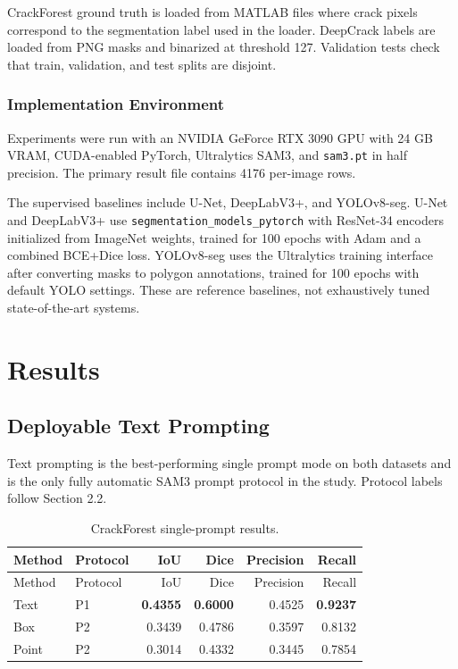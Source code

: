 \documentclass[applsci,article,submit,pdftex,moreauthors]{Definitions/mdpi}
\begin{document}
CrackForest ground truth is loaded from MATLAB files where crack pixels
correspond to the segmentation label used in the loader. DeepCrack
labels are loaded from PNG masks and binarized at threshold 127.
Validation tests check that train, validation, and test splits are
disjoint.

\subsubsection{Implementation Environment}

Experiments were run with an NVIDIA GeForce RTX 3090 GPU with 24 GB
VRAM, CUDA-enabled PyTorch, Ultralytics SAM3, and \texttt{sam3.pt} in
half precision. The primary result file contains 4176 per-image rows.

The supervised baselines include U-Net, DeepLabV3+, and YOLOv8-seg.
U-Net and DeepLabV3+ use \texttt{segmentation\_models\_pytorch} with
ResNet-34 encoders initialized from ImageNet weights, trained for 100
epochs with Adam and a combined BCE+Dice loss. YOLOv8-seg uses the
Ultralytics training interface after converting masks to polygon
annotations, trained for 100 epochs with default YOLO settings. These
are reference baselines, not exhaustively tuned state-of-the-art
systems.

\section{Results}

\subsection{Deployable Text Prompting}

Text prompting is the best-performing single prompt mode on both
datasets and is the only fully automatic SAM3 prompt protocol in the
study. Protocol labels follow Section 2.2.

\begin{longtable}[]{@{}llrrrr@{}}
\caption{CrackForest single-prompt results.}\tabularnewline
\toprule\noalign{}
Method & Protocol & IoU & Dice & Precision & Recall \\
\midrule\noalign{}
\endfirsthead
\toprule\noalign{}
Method & Protocol & IoU & Dice & Precision & Recall \\
\midrule\noalign{}
\endhead
\bottomrule\noalign{}
\endlastfoot
Text & P1 & \textbf{0.4355} & \textbf{0.6000} & 0.4525 &
\textbf{0.9237} \\
Box & P2 & 0.3439 & 0.4786 & 0.3597 & 0.8132 \\
Point & P2 & 0.3014 & 0.4332 & 0.3445 & 0.7854 \\
\end{longtable}
\end{document}
